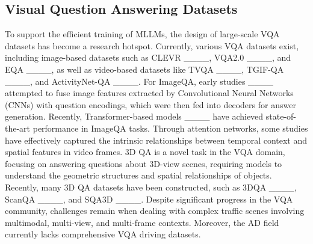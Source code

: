 \subsection{Visual Question Answering Datasets}

To support the efficient training of MLLMs, the design of large-scale VQA datasets has become a research hotspot. Currently, various VQA datasets exist, including image-based datasets such as CLEVR ____, VQA2.0 ____, and EQA ____, as well as video-based datasets like TVQA ____, TGIF-QA ____, and ActivityNet-QA ____. For ImageQA, early studies ____ attempted to fuse image features extracted by Convolutional Neural Networks (CNNs) with question encodings, which were then fed into decoders for answer generation. Recently, Transformer-based models ____ have achieved state-of-the-art performance in ImageQA tasks. Through attention networks, some studies have effectively captured the intrinsic relationships between temporal context and spatial features in video frames. 3D QA is a novel task in the VQA domain, focusing on answering questions about 3D-view scenes, requiring models to understand the geometric structures and spatial relationships of objects. Recently, many 3D QA datasets have been constructed, such as 3DQA ____, ScanQA ____, and SQA3D ____. Despite significant progress in the VQA community, challenges remain when dealing with complex traffic scenes involving multimodal, multi-view, and multi-frame contexts. Moreover, the AD field currently lacks comprehensive VQA driving datasets.
